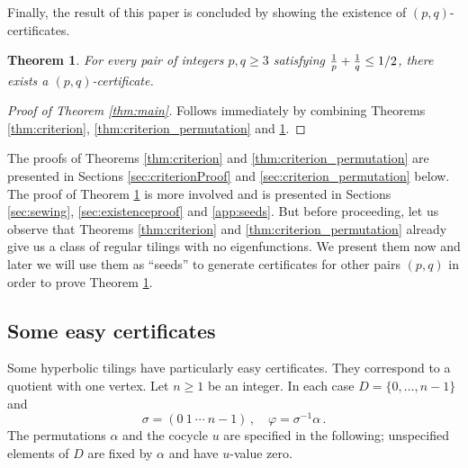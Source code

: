 \documentclass[11pt]{article}
\newtheorem{theorem}{Theorem}[section]
\theoremstyle{remark}
\begin{document}
Finally, the result of this paper is concluded by showing the existence of $(p,q)$-certificates. 

\begin{theorem}\label{thm:admissible}
For every pair of integers $p,q\geq 3$ satisfying ${1 \over p} + {1\over q} \leq 1/2$, there exists a $(p,q)$-certificate.
\end{theorem}


\begin{proof}[Proof of Theorem \ref{thm:main}]
Follows immediately by combining Theorems \ref{thm:criterion},  \ref{thm:criterion_permutation} and \ref{thm:admissible}.
\end{proof}

The proofs of Theorems \ref{thm:criterion} and \ref{thm:criterion_permutation} are presented in Sections \ref{sec:criterionProof} and \ref{sec:criterion_permutation} below. The proof of Theorem \ref{thm:admissible} is more involved and is presented in Sections \ref{sec:sewing}, \ref{sec:existenceproof} and \ref{app:seeds}. But before proceeding, let us observe that Theorems \ref{thm:criterion} and \ref{thm:criterion_permutation} already give us a class of regular tilings with no eigenfunctions. We present them now and later we will use them as ``seeds'' to generate certificates for other pairs $(p,q)$ in order to prove Theorem \ref{thm:admissible}.

\subsection{Some easy certificates}\label{sec:easypairs}

Some hyperbolic tilings have particularly easy certificates.  They correspond to a quotient with one vertex. Let $n\geq 1$ be an integer. In each case $D= \{0,\ldots, n-1\}$ and 
$$ \sigma = (0\ 1\ \cdots\ n-1) \, , \quad \varphi = \sigma^{-1} \alpha \, .$$
The permutations $\alpha$ and the cocycle $u$ are specified in the following; unspecified elements of $D$ are fixed by $\alpha$ and have $u$-value zero. 
\end{document}
